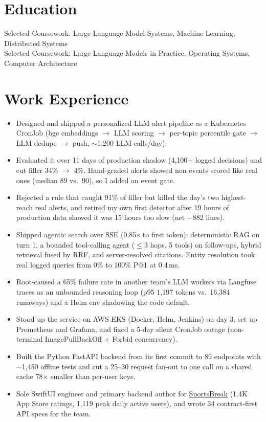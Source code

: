 \documentclass[11pt, letterpaper]{article}
\begin{document}

\section{Education}
Selected Coursework: Large Language Model Systems, Machine Learning, Distributed Systems\\[1pt]
Selected Coursework: Large Language Models in Practice, Operating Systems, Computer Architecture

\section{Work Experience}
\begin{itemize}
  \item Designed and shipped a personalized LLM alert pipeline as a Kubernetes CronJob (bge embeddings $\to$ LLM scoring $\to$ per-topic percentile gate $\to$ LLM dedupe $\to$ push, $\sim$1{,}200 LLM calls/day).
  \item Evaluated it over 11 days of production shadow (4{,}100+ logged decisions) and cut filler 34\% $\to$ 4\%. Hand-graded alerts showed non-events scored like real ones (median 89 vs.\ 90), so I added an event gate.
  \item Rejected a rule that caught 91\% of filler but killed the day's two highest-reach real alerts, and retired my own first detector after 19 hours of production data showed it was 15 hours too slow (net $-$882 lines).
  \item Shipped agentic search over SSE (0.85\,s to first token): deterministic RAG on turn 1, a bounded tool-calling agent ($\le$3 hops, 5 tools) on follow-ups, hybrid retrieval fused by RRF, and server-resolved citations. Entity resolution took real logged queries from 0\% to 100\% P@1 at 0.4\,ms.
  \item Root-caused a 65\% failure rate in another team's LLM workers via Langfuse traces as an unbounded reasoning loop (p95 1{,}197 tokens vs.\ 16{,}384 runaways) and a Helm env shadowing the code default.
  \item Stood up the service on AWS EKS (Docker, Helm, Jenkins) on day 3, set up Prometheus and Grafana, and fixed a 5-day silent CronJob outage (non-terminal ImagePullBackOff + Forbid concurrency).
  \item Built the Python FastAPI backend from its first commit to 89 endpoints with $\sim$1{,}450 offline tests and cut a 25--30 request fan-out to one call on a shared cache 78$\times$ smaller than per-user keys.
  \item Sole SwiftUI engineer and primary backend author for \href{https://apps.apple.com/app/id6762649287}{SportsBreak} (1.4K App Store ratings, 1{,}119 peak daily active users), and wrote 34 contract-first API specs for the team.
\end{itemize}
\end{document}
